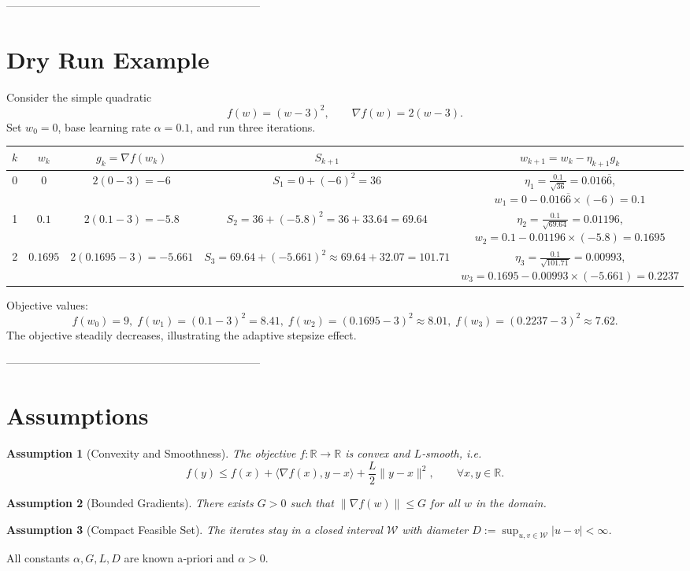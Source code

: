 \documentclass{article}
\newtheorem{assumption}{Assumption}
\begin{document}
---------------------------------------------------------------------

\section*{Dry Run Example}
Consider the simple quadratic
\[
f(w) = (w-3)^2 ,\qquad \nabla f(w)=2(w-3).
\]
Set $w_0=0$, base learning rate $\alpha=0.1$, and run three iterations.

\begin{center}
\begin{tabular}{c|c|c|c|c}
$k$ & $w_k$ & $g_k=\nabla f(w_k)$ & $S_{k+1}$ & $w_{k+1}=w_k-\eta_{k+1}g_k$\\ \hline
0 & $0$ & $2(0-3)=-6$ & $S_1=0+(-6)^2=36$ &
$\displaystyle \eta_1=\frac{0.1}{\sqrt{36}}=0.016\overline{6}$,\;
$w_1=0-0.016\overline{6}\times(-6)=0.1$ \\[6pt]
1 & $0.1$ & $2(0.1-3)=-5.8$ &
$S_2=36+(-5.8)^2=36+33.64=69.64$ &
$\displaystyle \eta_2=\frac{0.1}{\sqrt{69.64}}=0.01196$,\;
$w_2=0.1-0.01196\times(-5.8)=0.1695$ \\[6pt]
2 & $0.1695$ & $2(0.1695-3)=-5.661$ &
$S_3=69.64+(-5.661)^2\approx69.64+32.07=101.71$ &
$\displaystyle \eta_3=\frac{0.1}{\sqrt{101.71}}=0.00993$,\;
$w_3=0.1695-0.00993\times(-5.661)=0.2237$
\end{tabular}
\end{center}

Objective values:
\[
f(w_0)=9,\; f(w_1)= (0.1-3)^2=8.41,\;
f(w_2)= (0.1695-3)^2\approx8.01,\;
f(w_3)= (0.2237-3)^2\approx7.62.
\]
The objective steadily decreases, illustrating the adaptive stepsize effect.

---------------------------------------------------------------------

\section*{Assumptions}
\begin{assumption}[Convexity and Smoothness]\label{ass:convex}
The objective $f:\mathbb{R}\to\mathbb{R}$ is convex and $L$‑smooth, i.e.
\[
f(y)\le f(x)+\langle \nabla f(x),y-x\rangle +\frac{L}{2}\|y-x\|^{2},
\qquad\forall x,y\in\mathbb{R}.
\]
\end{assumption}
\begin{assumption}[Bounded Gradients]\label{ass:bounded}
There exists $G>0$ such that $\| \nabla f(w) \| \le G$ for all $w$ in the domain.
\end{assumption}
\begin{assumption}[Compact Feasible Set]\label{ass:compact}
The iterates stay in a closed interval $\mathcal{W}$ with diameter
$D:=\sup_{u,v\in\mathcal{W}}|u-v|<\infty$.
\end{assumption}
All constants $\alpha,G,L,D$ are known a‑priori and $\alpha>0$.
\end{document}
